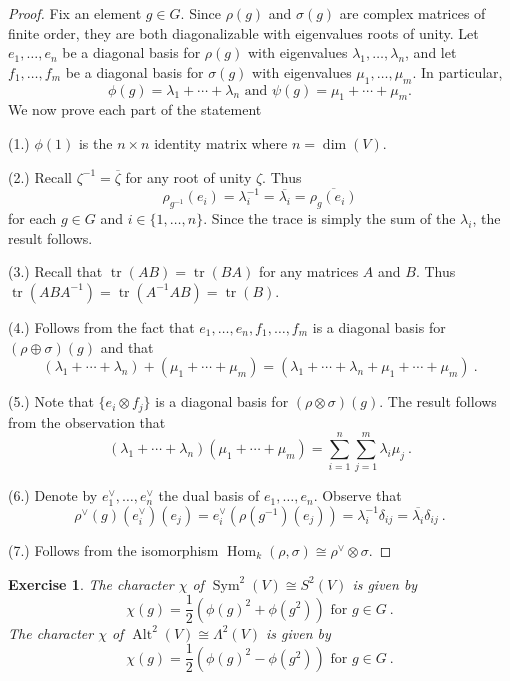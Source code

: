 \documentclass[12pt]{article}
\theoremstyle{plain}
\newtheorem{exercise}[theorem]{Exercise}
\theoremstyle{definition}
\theoremstyle{remark}
\numberwithin{equation}{section}
\begin{document}
\begin{proof}
Fix an element $g \in G$.
Since $\rho(g)$ and $\sigma(g)$ are complex matrices of finite order,
they are both diagonalizable with eigenvalues roots of unity.
Let $e_1,\ldots,e_n$ be a diagonal basis for $\rho(g)$
with eigenvalues $\lambda_1, \ldots, \lambda_n$, and
let $f_1, \ldots, f_m$ be a diagonal basis for $\sigma(g)$
with eigenvalues $\mu_1, \ldots, \mu_m$.
In particular,
\[
\phi(g) = \lambda_1 + \cdots + \lambda_n \textrm{ and }
\psi(g) = \mu_1 + \cdots + \mu_m.
\]
We now prove each part of the statement

(1.)
$\phi(1)$ is the $n \times n$ identity matrix where $n=\dim(V)$.


(2.)
Recall $\zeta^{-1}=\overline{\zeta}$ for any root of unity
$\zeta$.
Thus
\[
\rho_{g^{-1}}(e_i)=\lambda_i^{-1}=\overline{\lambda_i}=\overline{\rho_g(e_i)}
\]
for each $g \in G$ and $i \in \{1,\ldots,n\}$.
Since the trace is simply the sum of the $\lambda_i$, the result
follows.

(3.) Recall that $\operatorname{tr}(AB)=\operatorname{tr}(BA)$ for any
matrices $A$ and $B$.  Thus
$\operatorname{tr}(ABA^{-1})=\operatorname{tr}(A^{-1}AB)=\operatorname{tr}(B)$.



(4.) Follows from the fact that $e_1, \ldots, e_n, f_1, \ldots, f_m$ is a
diagonal basis for $(\rho \oplus \sigma)(g)$ and that
\[
(\lambda_1 + \cdots + \lambda_n) + (\mu_1 + \cdots + \mu_m) = 
(\lambda_1 + \cdots + \lambda_n + \mu_1 + \cdots + \mu_m) \ .
\]



(5.) Note that $\{ e_i \otimes f_j \}$ is a diagonal basis for
$(\rho \otimes \sigma)(g)$.  The result follows from the observation
that
\[
(\lambda_1 + \cdots + \lambda_n) (\mu_1 + \cdots + \mu_m)
= \sum_{i=1}^n \sum_{j=1}^m \lambda_i \mu_j \ .
\]



(6.) Denote by $e_1^\vee, \ldots, e_n^\vee$ the dual basis of $e_1,
\ldots, e_n$.
Observe that
\[
\rho^\vee(g)(e_i^\vee)(e_j)=e_i^\vee(\rho(g^{-1})(e_j))
= \lambda_i^{-1}\delta_{ij}=\overline{\lambda_i}\delta_{ij} \ .
\]



(7.) Follows from the isomorphism
$\operatorname{Hom}_k(\rho,\sigma) \cong \rho^\vee \otimes \sigma$.
\end{proof}


\begin{exercise}
The character $\chi$ of $\operatorname{Sym}^2(V) \cong S^2(V)$ is given by
\[
\chi(g) = \frac{1}{2}\left(\phi(g)^2 + \phi(g^2)\right)
\textrm{ for } g \in G \ .
\]
The character $\chi$ of $\operatorname{Alt}^2(V) \cong \Lambda^2(V)$ is given by
\[
\chi(g) = \frac{1}{2}\left(\phi(g)^2 - \phi(g^2)\right)
\textrm{ for } g \in G \ .
\]
\end{exercise}
\end{document}
